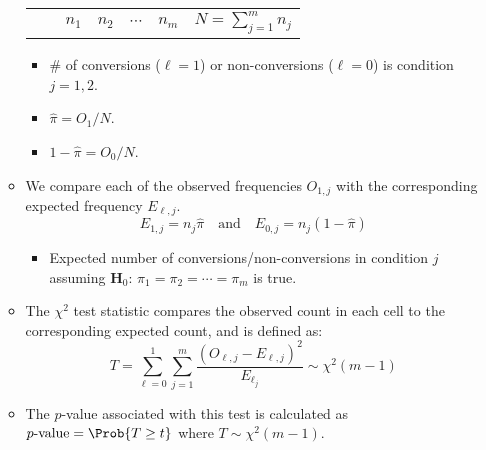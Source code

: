 \begin{itemize}
\begin{itemize}
\begin{table}[!htbp]
\begin{tabularx}{\linewidth}{@{}BYYYYYY@{}}
                                            &                    &  &  & $\cdots$ &  &  \\
                              \end{tabularx}
                        \end{table}
                        \begin{itemize}
                              \item \# of conversions ($ \ell=1 $) or non-conversions ($ \ell=0 $) is condition
                                    $ j=1,2 $.
                              \item $ \hat{\pi}=O_1/N $.
                              \item $ 1-\hat{\pi}=O_0/N $.
                        \end{itemize}
                  \item We compare each of the observed frequencies $ O_{1,j} $ with the corresponding expected
                        frequency $ E_{\ell,j} $.
                        \[ E_{1,j}=n_j\hat{\pi}\quad\text{and}\quad E_{0,j}=n_j(1-\hat{\pi}) \]
                        \begin{itemize}
                              \item Expected number of conversions/non-conversions in condition $ j $
                                    assuming $ \mathbf{H}_0 $: $ \pi_1=\pi_2=\cdots=\pi_m $ is true.
                        \end{itemize}
                  \item The $ \chi^2 $ test statistic
                        compares the observed count in each cell to the corresponding expected
                        count, and is defined as:
                        \[ T=\sum_{\ell=0}^{1} \sum_{j=1}^{m} \frac{(O_{\ell,j}-E_{\ell,j})^2}{E_{\ell_j}}\sim \chi^2(m-1)  \]
                  \item The $ p $-value associated with this test is calculated as
                        $ p\text{-value} = \Prob{T\ge t} $ where $ T \sim \chi^2(m-1) $.
            \end{itemize}
\end{itemize}

